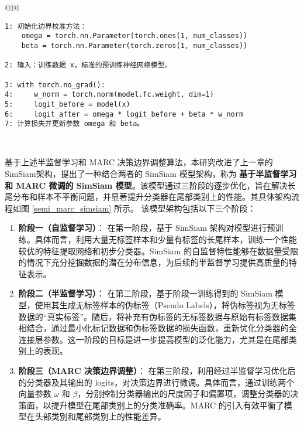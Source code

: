 \documentclass[master]{thesis-uestc}
\begin{document}
\begin{table}[h]
    \centering
    \begin{tabular}{@{}l@{}} %
    \toprule
     \\ %
    \midrule
    \begin{lstlisting}[basicstyle=\ttfamily,frame=none]
1: 初始化边界校准方法：
    omega = torch.nn.Parameter(torch.ones(1, num_classes))
    beta = torch.nn.Parameter(torch.zeros(1, num_classes))

2: 输入：训练数据 x，标准的预训练神经网络模型。

3: with torch.no_grad():
4:     w_norm = torch.norm(model.fc.weight, dim=1)
5:     logit_before = model(x)
6:     logit_after = omega * logit_before + beta * w_norm
7: 计算损失并更新参数 omega 和 beta。
    \end{lstlisting} \\
    \hline
    \end{tabular}
    \caption{MARC 算法的实现步骤}
    \label{alg:marc}
\end{table}

基于上述半监督学习和 MARC 决策边界调整算法，本研究改进了上一章的SimSiam架构，提出了一种结合两者的 SimSiam 模型架构，称为 \textbf{基于半监督学习和 MARC 微调的 SimSiam 模型}。该模型通过三阶段的逐步优化，旨在解决长尾分布和样本不平衡问题，并显著提升分类器在尾部类别上的性能。其具体架构流程如图 \ref{semi_marc_simsiam} 所示。
该模型架构包括以下三个阶段：

\begin{enumerate}
    \item \textbf{阶段一（自监督学习）}：  
    在第一阶段，基于 SimSiam 架构对模型进行预训练。具体而言，利用大量无标签样本和少量有标签的长尾样本，训练一个性能较优的特征提取网络和初步分类器。SimSiam 的自监督特性能够在数据量受限的情况下充分挖掘数据的潜在分布信息，为后续的半监督学习提供高质量的特征表示。

    \item \textbf{阶段二（半监督学习）}：  
    在第二阶段，基于阶段一训练得到的 SimSiam 模型，使用其生成无标签样本的伪标签（Pseudo Labels），将伪标签视为无标签数据的“真实标签”。随后，将补充有伪标签的无标签数据与原始有标签数据集相结合，通过最小化标记数据和伪标签数据的损失函数，重新优化分类器的全连接层参数。这一阶段的目标是进一步提高模型的泛化能力，尤其是在尾部类别上的表现。

    \item \textbf{阶段三（MARC 决策边界调整）}：  
    在第三阶段，利用经过半监督学习优化后的分类器及其输出的 logits，对决策边界进行微调。具体而言，通过训练两个向量参数 $\omega$ 和 $\beta$，分别控制分类器输出的尺度因子和偏置项，调整分类器的决策面，以提升模型在尾部类别上的分类准确率。MARC 的引入有效平衡了模型在头部类别和尾部类别上的性能差异。
\end{enumerate}
\end{document}
